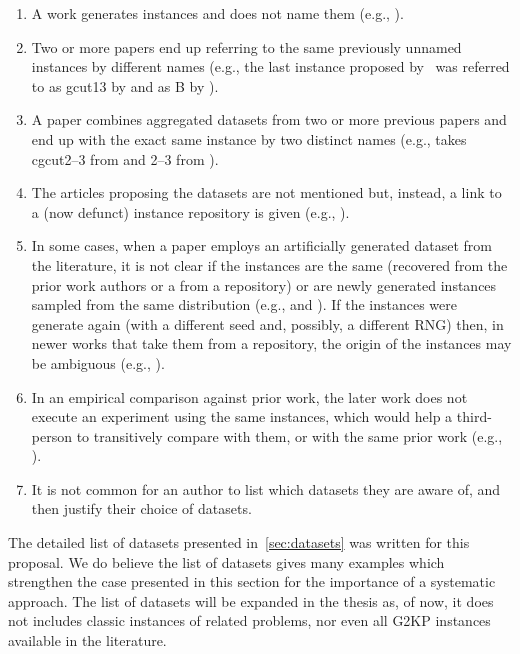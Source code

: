 \documentclass[ppgc,prop-tese,english,formais,babel]{iiufrgs}
\begin{document}
\begin{enumerate}
\item A work generates instances and does not name them (e.g., \citet{beasley:1985:guillotine,wang:1983,cw:1977}).
\item Two or more papers end up referring to the same previously unnamed instances by different names (e.g., the last instance proposed by~\citet{beasley:1985:guillotine} was referred to as gcut13 by \citet{martello:1998} and as B by \citet{fekete:1997}).
\item A paper combines aggregated datasets from two or more previous papers and end up with the exact same instance by two distinct names (e.g., \citet{furini:2016} takes cgcut2--3 from \citet{dolatabadi:2012} and 2--3 from \citet{hifi:2001}).
\item The articles proposing the datasets are not mentioned but, instead, a link to a (now defunct) instance repository is given (e.g., \citet{hifi:2001}).
\item In some cases, when a paper employs an artificially generated dataset from the literature, it is not clear if the instances are the same (recovered from the prior work authors or a from a repository) or are newly generated instances sampled from the same distribution (e.g., \citet{martello:1998} and \citet{berkey:1987}). If the instances were generate again (with a different seed and, possibly, a different RNG) then, in newer works that take them from a repository, the origin of the instances may be ambiguous (e.g., \citet{alvarez:2009}).
\item In an empirical comparison against prior work, the later work does not execute an experiment using the same instances, which would help a third-person to transitively compare with them, or with the same prior work (e.g., \citet{martin:2020:bottom}).
\item It is not common for an author to list which datasets they are aware of, and then justify their choice of datasets.
\end{enumerate}

The detailed list of datasets presented in~\cref{sec:datasets} was written for this proposal.
We do believe the list of datasets gives many examples which strengthen the case presented in this section for the importance of a systematic approach.
The list of datasets will be expanded in the thesis as, of now, it does not includes classic instances of related problems, nor even all G2KP instances available in the literature.
\end{document}
